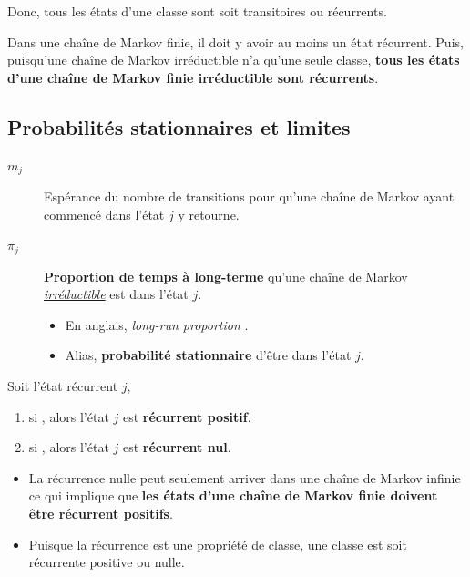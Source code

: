 \documentclass[french]{article}
\begin{document}
\begin{multicols*}{2}
Donc, tous les états d'une classe sont soit transitoires ou récurrents.

\bigskip
 
Dans une chaîne de Markov finie, il doit y avoir au moins un état récurrent. Puis, puisqu'une chaîne de Markov irréductible n'a qu'une seule classe, \textbf{tous les états d'une chaîne de Markov finie irréductible sont récurrents}.


\columnbreak
\subsection{Probabilités stationnaires et limites}
\begin{distributions}[Notation]
\begin{description}
	\item[$m_{j}$]	Espérance du nombre de transitions pour qu'une chaîne de Markov ayant commencé dans l'état $j$ y retourne.
	\item[$\pi_{j}$]	\textbf{Proportion de temps à long-terme} qu'une chaîne de Markov \textit{\underline{irréductible}} est dans l'état $j$.
		\begin{itemize}
		\item	En anglais, \og \textit{long-run proportion} \fg{}.
		\item	Alias, \textbf{probabilité stationnaire} d'être dans l'état $j$.
		\end{itemize}
\end{description}
\end{distributions}

\begin{definitionNOHFILLprop}
Soit l'état récurrent $j$, 
\begin{enumerate}
	\item	si , alors l'état $j$ est \textbf{récurrent positif}.
	\item	si , alors l'état $j$ est \textbf{récurrent nul}.
\end{enumerate}

\bigskip

\begin{itemize} 
	\item	La récurrence nulle peut seulement arriver dans une chaîne de Markov infinie ce qui implique que \textbf{les états d'une chaîne de Markov finie doivent être récurrent positifs}.
	\item	Puisque la récurrence est une propriété de classe, une classe est soit récurrente positive ou nulle.
\end{itemize}
\end{definitionNOHFILLprop}



\end{multicols*}
\end{document}
